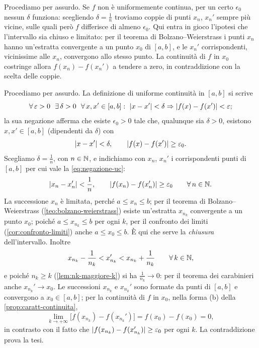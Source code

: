 \begin{strategia}
Procediamo per assurdo. Se $f$ non è uniformemente continua, per un certo $\epsilon_{0}$
nessun $\delta$ funziona: scegliendo $\delta=\frac1n$ troviamo coppie di punti
$x_{n}$, $x_{n}'$ sempre più vicine, sulle quali però $f$ differisce di almeno
$\epsilon_{0}$. Qui entra in gioco l'ipotesi che l'intervallo sia chiuso e limitato:
per il teorema di Bolzano--Weierstrass i punti $x_{n}$ hanno un'estratta convergente a
un punto $x_{0}$ di $[a,b]$, e le $x_{n}'$ corrispondenti, vicinissime alle $x_{n}$,
convergono allo stesso punto. La continuità di $f$ in $x_{0}$ costringe allora
$f(x_{n})-f(x_{n}')$ a tendere a zero, in contraddizione con la scelta delle coppie.
\end{strategia}

\begin{dimostrazione}
Procediamo per assurdo. La definizione di uniforme continuità in $[a,b]$ si scrive
\[
  \perogni\epsilon>0\ \ \esiste\delta>0\ \ \perogni x,x'\in[a,b] : \
  \abs{x-x'}<\delta\implica\abs{f(x)-f(x')}<\epsilon ;
\]
la sua negazione afferma che esiste $\epsilon_{0}>0$ tale che, qualunque sia $\delta>0$,
esistono $x,x'\in[a,b]$ (dipendenti da $\delta$) con
\begin{equation}\label{eq:negazione-uc}
  \lvert x-x'\rvert<\delta, \qquad \lvert f(x)-f(x')\rvert\ge\varepsilon_{0} .
\end{equation}
Scegliamo $\delta=\frac1n$, con $n\in\mathbb{N}$, e indichiamo con $x_{n}$, $x_{n}'$ i
corrispondenti punti di $[a,b]$ per cui vale la \eqref{eq:negazione-uc}:
\[
  \lvert x_{n}-x_{n}'\rvert<\frac1n, \qquad \lvert f(x_{n})-f(x_{n}')\rvert\ge\varepsilon_{0}
  \qquad\forall\, n\in\mathbb{N} .
\]
La successione $x_{n}$ è limitata, perché $a\le x_{n}\le b$; per il teorema di
Bolzano--Weierstrass (\cref{teo:bolzano-weierstrass}) esiste un'estratta $x_{n_{k}}$
convergente a un punto $x_{0}$; poiché $a\le x_{n_{k}}\le b$ per ogni $k$, per il
confronto dei limiti (\cref{cor:confronto-limiti}) anche $a\le x_{0}\le b$. È qui che
serve la \emph{chiusura} dell'intervallo. Inoltre
\[
  x_{n_{k}}-\frac1{n_{k}}<x_{n_{k}}'<x_{n_{k}}+\frac1{n_{k}} \qquad\forall\, k\in\mathbb{N},
\]
e poiché $n_{k}\ge k$ (\cref{lem:nk-maggiore-k}) si ha $\frac1{n_{k}}\to0$: per il teorema
dei carabinieri anche $x_{n_{k}}'\to x_{0}$. Le successioni $x_{n_{k}}$ e $x_{n_{k}}'$
sono formate da punti di $[a,b]$ e convergono a $x_{0}\in[a,b]$; per la continuità di
$f$ in $x_{0}$, nella forma (b) della \cref{prop:caratt-continuita},
\[
  \lim_{k\to+\infty}\bigl[f(x_{n_{k}})-f(x_{n_{k}}')\bigr]=f(x_{0})-f(x_{0})=0 ,
\]
in contrasto con il fatto che $\lvert f(x_{n_{k}})-f(x_{n_{k}}')\rvert\ge\varepsilon_{0}$ per ogni
$k$. La contraddizione prova la tesi.
\end{dimostrazione}

